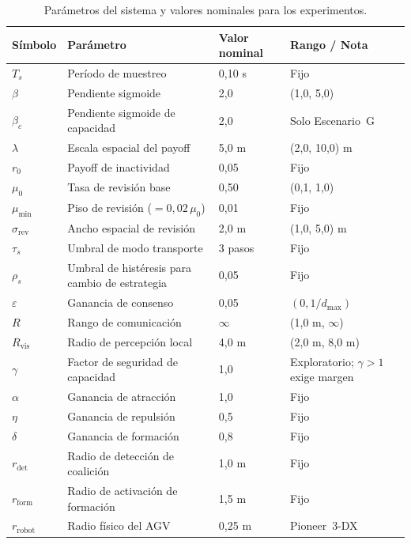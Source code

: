 \begin{table}[htbp]
\centering
\scriptsize
\renewcommand{\arraystretch}{1.08}
\caption[Parámetros del sistema]{Parámetros del sistema y valores nominales para los experimentos.}
\label{tab:params}
\begin{tabularx}{\textwidth}{>{\ttfamily}p{}p{}p{}Y}
\toprule
\normalfont Símbolo & Parámetro & Valor nominal & Rango / Nota \\
\midrule
$T_s$ & Período de muestreo & 0{,}10 s & Fijo \\
$\beta$ & Pendiente sigmoide & 2{,}0 & (1{,}0, 5{,}0) \\
$\beta_c$ & Pendiente sigmoide de capacidad & 2{,}0 & Solo Escenario~G \\
$\lambda$ & Escala espacial del payoff & 5{,}0 m & (2{,}0, 10{,}0) m \\
$r_0$ & Payoff de inactividad & 0{,}05 & Fijo \\
$\mu_0$ & Tasa de revisión base & 0{,}50 & (0{,}1, 1{,}0) \\
$\mu_{\min}$ & Piso de revisión ($= 0{,}02\,\mu_0$) & 0{,}01 & Fijo \\
$\sigma_{\text{rev}}$ & Ancho espacial de revisión & 2{,}0 m & (1{,}0, 5{,}0) m \\
$\tau_s$ & Umbral de modo transporte & 3 pasos & Fijo \\
$\rho_s$ & Umbral de histéresis para cambio de estrategia & 0{,}05 & Fijo \\
$\varepsilon$ & Ganancia de consenso & 0{,}05 & $(0, 1/d_{\max})$ \\
$R$ & Rango de comunicación & $\infty$ & (1{,}0 m, $\infty$) \\
$R_{\mathrm{vis}}$ & Radio de percepción local & 4{,}0 m & (2{,}0 m, 8{,}0 m) \\
$\gamma$ & Factor de seguridad de capacidad & 1{,}0 & Exploratorio; $\gamma>1$ exige margen \\
$\alpha$ & Ganancia de atracción & 1{,}0 & Fijo \\
$\eta$ & Ganancia de repulsión & 0{,}5 & Fijo \\
$\delta$ & Ganancia de formación & 0{,}8 & Fijo \\
$r_{\mathrm{det}}$ & Radio de detección de coalición & 1{,}0 m & Fijo \\
$r_{\mathrm{form}}$ & Radio de activación de formación & 1{,}5 m & Fijo \\
$r_{\mathrm{robot}}$ & Radio físico del AGV & 0{,}25 m & Pioneer~3-DX \\

\end{tabularx}
\end{table}
